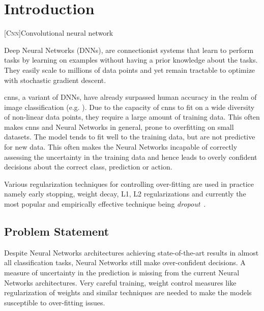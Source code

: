 \chapter{Introduction}  %

\ifpdf
    \graphicspath{{Chapter1/Figs/Raster/}{Chapter1/Figs/PDF/}{Chapter1/Figs/}}
\else
    \graphicspath{{Chapter1/Figs/Vector/}{Chapter1/Figs/}}
\fi



[\textsc{Cnn}]{Convolutional neural network}

Deep Neural Networks (DNNs), are connectionist systems that learn to perform tasks by learning on examples without having a prior knowledge about the tasks. 
They easily scale to millions of data points and yet remain tractable to optimize with stochastic gradient descent.

\acp{cnn}, a variant of DNNs, have already surpassed human accuracy in the realm of image classification (e.g. \cite{he2016deep,simonyan2014very,krizhevsky2012imagenet}). Due to the capacity of \acp{cnn} to fit on a wide diversity of non-linear data points, they require a large amount of training data. This often makes \acp{cnn} and Neural Networks in general, prone to overfitting on small datasets. The model tends to fit well to the training data, but are not predictive for new data. This often makes the Neural Networks incapable of correctly assessing the uncertainty in the training data and hence leads to overly confident decisions about the correct class, prediction or action.

Various regularization techniques for controlling over-fitting are used in practice namely early stopping, weight decay, L1, L2 regularizations and currently the most popular and empirically effective technique being \emph{dropout}~\cite{hinton2012improving}. 


\section{Problem Statement}

Despite Neural Networks architectures achieving state-of-the-art results in almost all classification tasks, Neural Networks still make over-confident decisions. A measure of uncertainty in the prediction is missing from the current Neural Networks architectures. Very careful training, weight control measures like regularization of weights and similar techniques are needed to make the models susceptible to over-fitting issues. 

